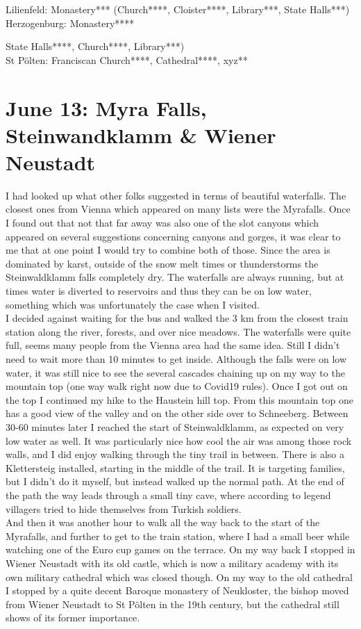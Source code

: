 Lilienfeld: Monastery*** (Church****, Cloister****, Library***, State Halls***)\\
Herzogenburg: Monastery****{State Halls****, Church****, Library***)\\
St P\"olten: Franciscan Church****, Cathedral****, xyz**

\section{June 13: Myra Falls, Steinwandklamm \& Wiener Neustadt}
\label{2021Myrafalls}

I had looked up what other folks suggested in terms of beautiful waterfalls. The closest ones from Vienna which appeared on many lists were the Myrafalls. Once I found out that not that far away was also one of the slot canyons which appeared on several suggestions concerning canyons and gorges, it was clear to me that at one point I would try to combine both of those. Since the area is dominated by karst, outside of the snow melt times or thunderstorms the Steinwaldklamm falls completely dry. The waterfalls are always running, but at times water is diverted to reservoirs and thus they can be on low water, something which was unfortunately the case when I visited.\\
I decided against waiting for the bus and walked the 3 km from the closest train station along the river, forests, and over nice meadows. The waterfalls were quite full, seems many people from the Vienna area had the same idea. Still I didn't need to wait more than 10 minutes to get inside. Although the falls were on low water, it was still nice to see the several cascades chaining up on my way to the mountain top (one way walk right now due to Covid19 rules). Once I got out on the top I continued my hike to the Haustein hill top. From this mountain top one has a good view of the valley and on the other side over to Schneeberg. Between 30-60 minutes later I reached the start of Steinwaldklamm, as expected on very low water as well. It was particularly nice how cool the air was among those rock walls, and I did enjoy walking through the tiny trail in between. There is also a Klettersteig installed, starting in the middle of the trail. It is targeting families, but I didn't do it myself, but instead walked up the normal path. At the end of the path the way leads through a small tiny cave, where according to legend villagers tried to hide themselves from Turkish soldiers.\\
And then it was another hour to walk all the way back to the start of the Myrafalls, and further to get to the train station, where I had a small beer while watching one of the Euro cup games on the terrace. On my way back I stopped in Wiener Neustadt with its old castle, which is now a military academy with its own military cathedral which was closed though. On my way to the old cathedral I stopped by a quite decent Baroque monastery of Neukloster, the bishop moved from Wiener Neustadt to St P\"olten in the 19th century, but the cathedral still shows of its former importance.\\

}
